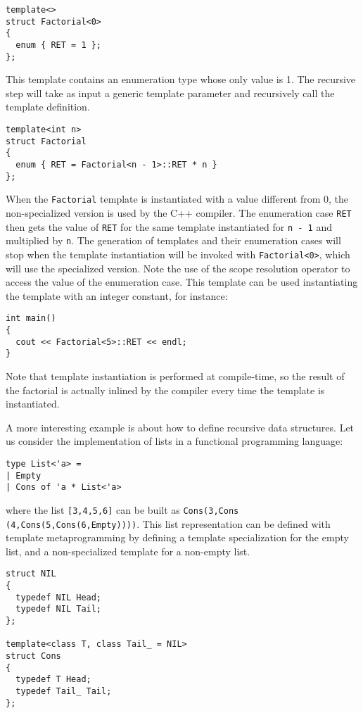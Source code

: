 \begin{lstlisting}
template<>
struct Factorial<0>
{
  enum { RET = 1 };
};
\end{lstlisting}

This template contains an enumeration type whose only value is 1. The recursive step will take as input a generic template parameter and recursively call the template definition.

\begin{lstlisting}
template<int n>
struct Factorial
{
  enum { RET = Factorial<n - 1>::RET * n }
};
\end{lstlisting}

\noindent
When the \texttt{Factorial} template is instantiated with a value different from 0, the non-specialized version is used by the C++ compiler. The enumeration case \texttt{RET} then gets the value of \texttt{RET} for the same template instantiated for \texttt{n - 1} and multiplied by \texttt{n}. The generation of templates and their enumeration cases will stop when the template instantiation will be invoked with \texttt{Factorial<0>}, which will use the specialized version. Note the use of the scope resolution operator to access the value of the enumeration case. This template can be used instantiating the template with an integer constant, for instance:

\begin{lstlisting}
int main()
{
  cout << Factorial<5>::RET << endl;
}
\end{lstlisting}

\noindent
Note that template instantiation is performed at compile-time, so the result of the factorial is actually inlined by the compiler every time the template is instantiated.

A more interesting example is about how to define recursive data structures. Let us consider the implementation of lists in a functional programming language:

\begin{lstlisting}
type List<'a> =
| Empty
| Cons of 'a * List<'a>
\end{lstlisting}

\noindent
where the list \texttt{[3,4,5,6]} can be built as \texttt{Cons(3,Cons\\(4,Cons(5,Cons(6,Empty))))}. This list representation can be defined with template metaprogramming by defining a template specialization for the empty list, and a non-specialized template for a non-empty list.

\begin{lstlisting}
struct NIL
{
  typedef NIL Head;
  typedef NIL Tail;
};

template<class T, class Tail_ = NIL>
struct Cons
{
  typedef T Head;
  typedef Tail_ Tail;
};
\end{lstlisting}


